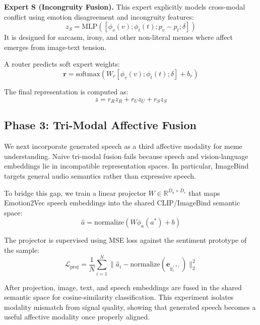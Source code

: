 \textbf{Expert S (Incongruity Fusion).}
This expert explicitly models cross-modal conflict using emotion disagreement and incongruity features:
\begin{equation}
  z_S=\text{MLP}([\phi_v(v);\phi_t(t);p_v-p_t;\delta])
\end{equation}
It is designed for sarcasm, irony, and other non-literal memes where affect emerges from image-text tension.

A router predicts soft expert weights:
\begin{equation}
  \mathbf{r}=
  \text{softmax}(W_r[\phi_v(v);\phi_t(t);\delta]+b_r)
\end{equation}

The final representation is computed as:
\begin{equation}
  z=r_R z_R+r_U z_U+r_S z_S
\end{equation}


\subsection{Phase 3: Tri-Modal Affective Fusion}

We next incorporate generated speech as a third affective modality for meme understanding. Naive tri-modal fusion fails because speech and vision-language embeddings lie in incompatible representation spaces. In particular, ImageBind targets general audio semantics rather than expressive speech.

To bridge this gap, we train a linear projector $W\in\mathbb{R}^{D_a\times D_c}$ that maps Emotion2Vec speech embeddings into the shared CLIP/ImageBind semantic space:
\begin{equation}
  \hat{a}=\text{normalize}(W\phi_a(a^*)+b)
\end{equation}

The projector is supervised using MSE loss against the sentiment prototype of the sample:
\begin{equation}
  \mathcal{L}_{\text{proj}}
  =
  \frac{1}{N}\sum_{i=1}^N
  \|\hat{a}_i-\text{normalize}(\mathbf{e}_{y_i^{(s)}})\|_2^2
\end{equation}

After projection, image, text, and speech embeddings are fused in the shared semantic space for cosine-similarity classification. This experiment isolates modality mismatch from signal quality, showing that generated speech becomes a useful affective modality once properly aligned.
